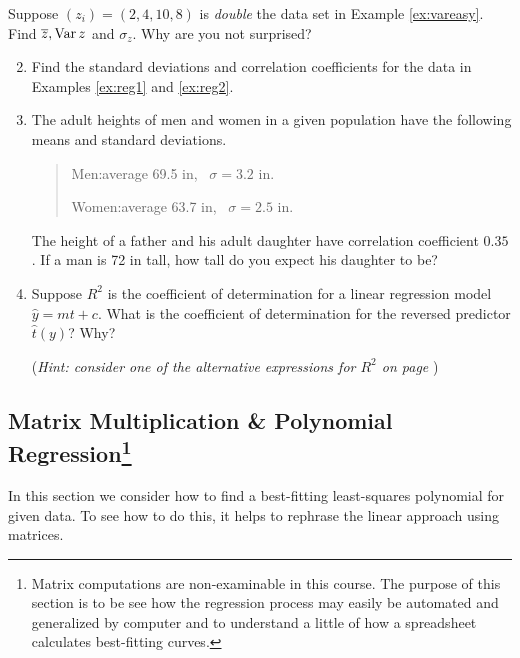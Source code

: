 \begin{exercises}{}{}
\exstart Suppose $(z_i)=(2,4,10,8)$ is \emph{double} the data set in Example \ref{ex:vareasy}. Find $\overline{z},\operatorname{Var} z$ and $\sigma_z$. Why are you not surprised?

\begin{enumerate}\setcounter{enumi}{1}
  \item Find the standard deviations and correlation coefficients for the data in Examples \ref{ex:reg1} and \ref{ex:reg2}.
  
  
  \item The adult heights of men and women in a given population have the following means and standard deviations.
  \begin{quote}
  Men:\lstsp average 69.5 in, \ $\sigma=3.2$ in.\par
  Women:\lstsp average 63.7 in, \ $\sigma=2.5$ in.
  \end{quote}
  The height of a father and his adult daughter have correlation coefficient $0.35$. If a man is 72 in tall, how tall do you expect his daughter to be?

  
  \item Suppose $R^2$ is the coefficient of determination for a linear regression model $\hat y=mt+c$. What is the coefficient of determination for the reversed predictor $\hat t(y)$? Why?\par
  (\emph{Hint: consider one of the alternative expressions for $R^2$ on page \pageref{pg:rsqalt}})
\end{enumerate}

\end{exercises}

\clearpage



\subsection[Matrix Multiplication \& Polynomial Regression]{Matrix Multiplication \& Polynomial Regression\footnote{Matrix computations are non-examinable in this course. The purpose of this section is to be see how the regression process may easily be automated and generalized by computer and to understand a little of how a spreadsheet calculates best-fitting curves.}}

In this section we consider how to find a best-fitting least-squares polynomial for given data. To see how to do this, it helps to rephrase the linear approach using matrices.
\bigskip

